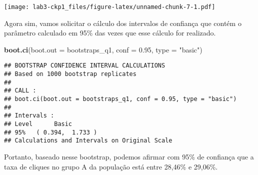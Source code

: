 \documentclass[]{article}
\newenvironment{Shaded}{\begin{snugshade}}{\end{snugshade}}
\newcommand{\KeywordTok}[1]{\textcolor[rgb]{0.13,0.29,0.53}{\textbf{#1}}}
\newcommand{\DataTypeTok}[1]{\textcolor[rgb]{0.13,0.29,0.53}{#1}}
\newcommand{\DecValTok}[1]{\textcolor[rgb]{0.00,0.00,0.81}{#1}}
\newcommand{\FloatTok}[1]{\textcolor[rgb]{0.00,0.00,0.81}{#1}}
\newcommand{\StringTok}[1]{\textcolor[rgb]{0.31,0.60,0.02}{#1}}
\newcommand{\OperatorTok}[1]{\textcolor[rgb]{0.81,0.36,0.00}{\textbf{#1}}}
\newcommand{\NormalTok}[1]{#1}
\begin{document}
\begin{Shaded}
\end{Shaded}

\texttt{[image: lab3-ckp1\_files/figure-latex/unnamed-chunk-7-1.pdf]}

Agora sim, vamos solicitar o cálculo dos intervalos de confiança que
contém o parâmetro calculado em 95\% das vezes que esse cálculo for
realizado.

\begin{Shaded}
\begin{Highlighting}[]
\KeywordTok{boot.ci}\NormalTok{(}\DataTypeTok{boot.out =}\NormalTok{ bootstraps_q1, }\DataTypeTok{conf =} \FloatTok{0.95}\NormalTok{, }\DataTypeTok{type =} \StringTok{"basic"}\NormalTok{)}
\end{Highlighting}
\end{Shaded}

\begin{verbatim}
## BOOTSTRAP CONFIDENCE INTERVAL CALCULATIONS
## Based on 1000 bootstrap replicates
## 
## CALL : 
## boot.ci(boot.out = bootstraps_q1, conf = 0.95, type = "basic")
## 
## Intervals : 
## Level      Basic         
## 95%   ( 0.394,  1.733 )  
## Calculations and Intervals on Original Scale
\end{verbatim}

Portanto, baseado nesse bootstrap, podemos afirmar com 95\% de confiança
que a taxa de cliques no grupo A da população está entre 28,46\% e
29,06\%.
\end{document}
